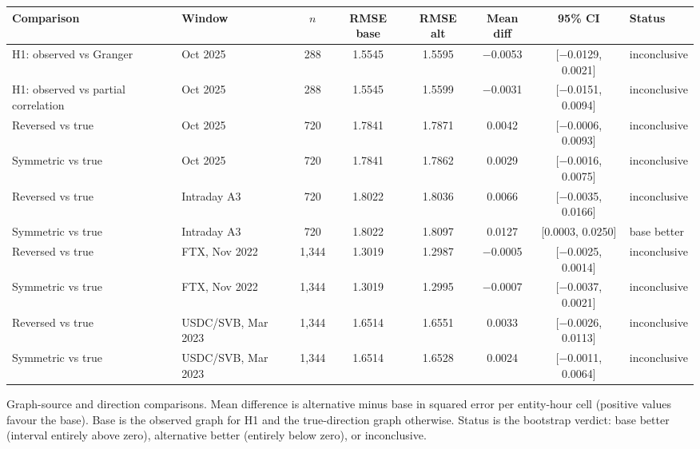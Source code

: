 \documentclass[referee,pdflatex,sn-mathphys-ay]{sn-jnl}
\newcommand{\fitbox}{\ifdim\wd\tabbox>\linewidth\resizebox{\linewidth}{!}{\usebox{\tabbox}}\else\usebox{\tabbox}\fi}%
\theoremstyle{thmstyleone}%
\theoremstyle{thmstyletwo}%
\theoremstyle{thmstylethree}%
\begin{document}
\begin{lrbox}{\tabbox}\footnotesize\setlength{\tabcolsep}{3pt}%
\begin{tabular}{@{}llcccccl@{}}
\toprule
\textbf{Comparison} & \textbf{Window} & \textbf{$n$} & \textbf{RMSE base} & \textbf{RMSE alt} & \textbf{Mean diff} & \textbf{95\% CI} & \textbf{Status}\\
\midrule
H1: observed vs Granger & Oct 2025 & 288 & 1.5545 & 1.5595 & $-$0.0053 & [$-$0.0129, 0.0021] & inconclusive \\
H1: observed vs partial correlation & Oct 2025 & 288 & 1.5545 & 1.5599 & $-$0.0031 & [$-$0.0151, 0.0094] & inconclusive \\
\midrule
Reversed vs true & Oct 2025 & 720 & 1.7841 & 1.7871 & 0.0042 & [$-$0.0006, 0.0093] & inconclusive \\
Symmetric vs true & Oct 2025 & 720 & 1.7841 & 1.7862 & 0.0029 & [$-$0.0016, 0.0075] & inconclusive \\
\midrule
Reversed vs true & Intraday A3 & 720 & 1.8022 & 1.8036 & 0.0066 & [$-$0.0035, 0.0166] & inconclusive \\
Symmetric vs true & Intraday A3 & 720 & 1.8022 & 1.8097 & 0.0127 & [0.0003, 0.0250] & base better \\
\midrule
Reversed vs true & FTX, Nov 2022 & 1{,}344 & 1.3019 & 1.2987 & $-$0.0005 & [$-$0.0025, 0.0014] & inconclusive \\
Symmetric vs true & FTX, Nov 2022 & 1{,}344 & 1.3019 & 1.2995 & $-$0.0007 & [$-$0.0037, 0.0021] & inconclusive \\
Reversed vs true & USDC/SVB, Mar 2023 & 1{,}344 & 1.6514 & 1.6551 & 0.0033 & [$-$0.0026, 0.0113] & inconclusive \\
Symmetric vs true & USDC/SVB, Mar 2023 & 1{,}344 & 1.6514 & 1.6528 & 0.0024 & [$-$0.0011, 0.0064] & inconclusive \\
\bottomrule
\end{tabular}
\end{lrbox}
\begin{tableorg}[tbp]
\centering
\caption{Graph-source and direction comparisons. Mean difference is alternative minus base in squared error per entity-hour
cell (positive values favour the base). Base is the observed graph for H1 and the true-direction graph otherwise. Status is
the bootstrap verdict: base better (interval entirely above zero), alternative better (entirely below zero), or inconclusive.}
\label{tab:diagnostics}
\fitbox
\end{tableorg}
\end{document}
